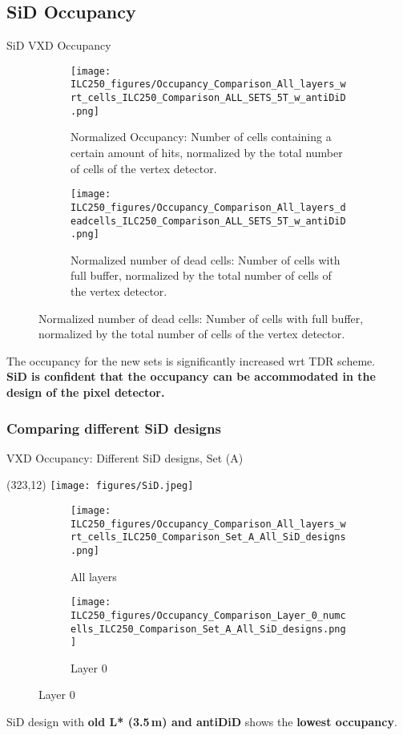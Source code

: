 \documentclass[xcolor={dvipsnames}]{beamer}
\newcommand{\sidlogo}{
  \setlength{\TPHorizModule}{1pt}
  \setlength{\TPVertModule}{1pt}
  \begin{textblock}{1}(323,12)
   \texttt{[image: figures/SiD.jpeg]}
  \end{textblock}
  }
\begin{document}
\subsection{SiD Occupancy}
\begin{frame}{SiD VXD Occupancy}
 \begin{figure}
\centering
\begin{subfigure}[t]{0.48\textwidth}
\centering
\texttt{[image: ILC250\_figures/Occupancy\_Comparison\_All\_layers\_wrt\_cells\_ILC250\_Comparison\_ALL\_SETS\_5T\_w\_antiDiD.png]}
\caption{\alert{Normalized Occupancy}: Number of cells containing a certain amount of hits, normalized by the total number of cells of the vertex detector.}
\end{subfigure}
\hspace*{0.2cm}
\begin{subfigure}[t]{0.48\textwidth}
\centering
\texttt{[image: ILC250\_figures/Occupancy\_Comparison\_All\_layers\_deadcells\_ILC250\_Comparison\_ALL\_SETS\_5T\_w\_antiDiD.png]}
\caption{\alert{Normalized number of dead cells}: Number of cells with full buffer, normalized by the total number of cells of the vertex detector.}
\end{subfigure}
\end{figure}
The occupancy for the new sets is significantly increased wrt TDR scheme.\\
\textbf{SiD is confident that the occupancy can be accommodated in the design of the pixel detector.}
\end{frame}

\subsubsection{Comparing different SiD designs}
\begin{frame}{VXD Occupancy: Different SiD designs, Set (A)}
\sidlogo

\begin{figure}
\centering
\begin{subfigure}[t]{0.48\textwidth}
\centering
\texttt{[image: ILC250\_figures/Occupancy\_Comparison\_All\_layers\_wrt\_cells\_ILC250\_Comparison\_Set\_A\_All\_SiD\_designs.png]}
\caption{\alert{All layers}}
 \end{subfigure}
\hspace*{0.2cm}
\begin{subfigure}[t]{0.48\textwidth}
\centering
\texttt{[image: ILC250\_figures/Occupancy\_Comparison\_Layer\_0\_numcells\_ILC250\_Comparison\_Set\_A\_All\_SiD\_designs.png]}
\caption{\alert{Layer 0}}
\end{subfigure}
\end{figure}
\normalsize SiD design with \textbf{old L* (3.5\,m) and antiDiD} shows the \textbf{lowest occupancy}.
\end{frame}
\end{document}
